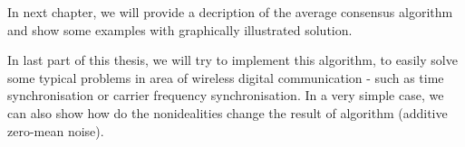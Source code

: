 In next chapter, we will provide a decription of the average consensus algorithm and show some examples with graphically illustrated solution. 

In last part of this thesis, we will try to implement this algorithm, to easily solve some typical problems in area of wireless digital communication - such as time synchronisation or carrier frequency synchronisation. In a very simple case, we can also show how do the nonidealities change the result of algorithm (additive zero-mean noise).





